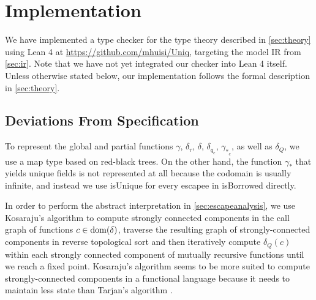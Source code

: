 \chapter{Implementation}\label{sec:implementation}

We have implemented a type checker for the type theory described in \cref{sec:theory} using Lean 4 at \url{https://github.com/mhuisi/Uniq}, targeting the model IR from \cref{sec:ir}. Note that we have not yet integrated our checker into Lean 4 itself. Unless otherwise stated below, our implementation follows the formal description in \cref{sec:theory}.

\section{Deviations From Specification}

To represent the global and partial functions $\gamma$, $\delta_\tau$, $\delta$, $\delta_{q_e}$, $\gamma_{*_e}$, as well as $\delta_Q$, we use a map type based on red-black trees. On the other hand, the function $\gamma_*$ that yields unique fields is not represented at all because the codomain is usually infinite, and instead we use isUnique for every escapee in isBorrowed directly.

In order to perform the abstract interpretation in \cref{sec:escapeanalysis}, we use Kosaraju's algorithm \citep{sharir_strong-connectivity_1981} to compute strongly connected components in the call graph of functions $c \in \mathrm{dom}(\delta)$, traverse the resulting graph of strongly-connected components in reverse topological sort and then iteratively compute $\delta_Q(c)$ within each strongly connected component of mutually recursive functions until we reach a fixed point. Kosaraju's algorithm seems to be more suited to compute strongly-connected components in a functional language because it needs to maintain less state than Tarjan's algorithm \citep{tarjan_depth-first_1972}.

